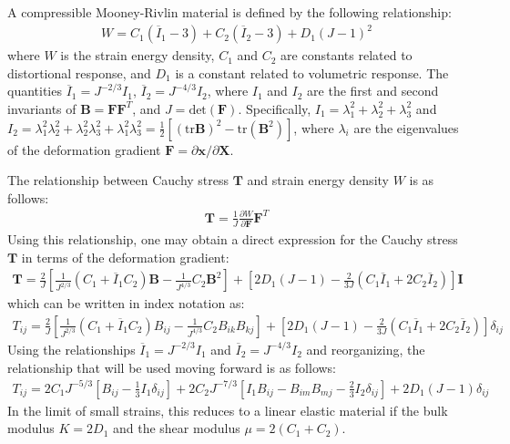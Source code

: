 A compressible Mooney-Rivlin material is defined by the following relationship:
\begin{align}
W = C_1(\overline{I}_1 - 3) + C_2(\overline{I}_2 - 3) + D_1(J - 1)^2
\end{align}
where $W$ is the strain energy density, $C_1$ and $C_2$ are constants related to distortional response, and $D_1$ is a constant related to volumetric response. The quantities $\overline{I}_1 = J^{-2/3}I_1$, $\overline{I}_2 = J^{-4/3}I_2$, where $I_1$ and $I_2$ are the first and second invariants of $\bm{B} = {\bm F}{\bm F}^T$, and $J = \text{det}({\bm F})$. Specifically, $I_1 = \lambda_1^2 + \lambda_2^2 + \lambda_3^2$ and $I_2 = \lambda_1^2\lambda_2^2 + \lambda_2^2\lambda_3^2 + \lambda_1^2\lambda_3^2 = \frac{1}{2}[(\text{tr}{\bm B})^2 - \text{tr}({\bm B}^2)]$, where $\lambda_i$ are the eigenvalues of the deformation gradient ${\bm F} = {\partial {\bm x}}/{\partial {\bm X}}$.

The relationship between Cauchy stress ${\bm T}$ and strain energy density $W$ is as follows:
\begin{align}
{\bm T} = \frac{1}{J}\frac{\partial W}{\partial {\bm F}}{\bm F}^{T}
\end{align}
Using this relationship, one may obtain a direct expression for the Cauchy stress ${\bm T}$ in terms of the deformation gradient:
\begin{align}
{\bm T} = \frac{2}{J}\left[\frac{1}{J^{2/3}}(C_1 + \overline{I}_1{C_2}){\bm B} - \frac{1}{J^{4/3}}C_2{\bm B}^2\right] + \left[2D_1(J-1) - \frac{2}{3J}(C_1\overline{I}_1 + 2C_2\overline{I}_2)\right]{\bm I}
\end{align}
which can be written in index notation as:
\begin{align}
T_{ij} = \frac{2}{J}\left[\frac{1}{J^{2/3}}(C_1 + \overline{I}_{1}C_2)B_{ij} - \frac{1}{J^{4/3}}C_2B_{ik}B_{kj}\right] + \left[2D_1(J-1) - \frac{2}{3J}(C_1\overline{I}_{1} + 2C_2\overline{I}_{2})\right]\delta_{ij}
\end{align}
Using the relationships $\overline{I}_{1} = J^{-2/3}I_1$ and $\overline{I}_{2} = J^{-4/3}I_2$ and reorganizing, the relationship that will be used moving forward is as follows:
\begin{align}
\label{eq:stress}
T_{ij} = 2C_1J^{-5/3}\left[B_{ij} - \frac{1}{3}I_1\delta_{ij}\right] + 2C_2J^{-7/3}\left[I_1B_{ij} - B_{im}B_{mj} - \frac{2}{3}I_2\delta_{ij}\right] + 2D_1(J-1)\delta_{ij}
\end{align}
In the limit of small strains, this reduces to a linear elastic material if the bulk modulus $K = 2D_1$ and the shear modulus $\mu = 2(C_1 + C_2)$.

